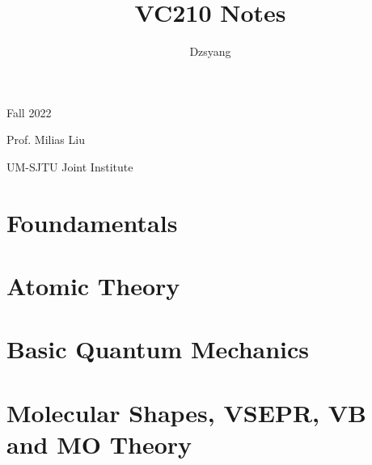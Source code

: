\documentclass[a4paper,12pt]{article}
\begin{document}
\title{\huge VC210 Notes} %
\author{Dzsyang}

\maketitle %
\thispagestyle{fancy}

\begin{center}

\large Fall 2022\par
\large Prof. Milias Liu\par
\large UM-SJTU Joint Institute
\end{center}

\newpage

\tableofcontents

\newpage



\newpage
\section{Foundamentals}

\newpage
\section{Atomic Theory}

\newpage
\section{Basic Quantum Mechanics}

\newpage
\section{Molecular Shapes, VSEPR, VB and MO Theory}
\end{document}
